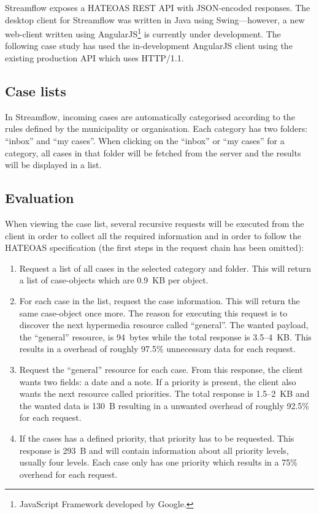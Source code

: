 \documentclass{cslthse-msc}
\begin{document}
Streamflow exposes a HATEOAS REST API with JSON-encoded responses. The desktop client for Streamflow was written in Java using Swing---however, a new web-client written using AngularJS\footnote{JavaScript Framework developed by Google.} is currently under development. The following case study has used the in-development AngularJS client using the existing production API which uses HTTP/1.1.

\subsection{Case lists}
In Streamflow, incoming cases are automatically categorised according to the rules defined by the municipality or organisation. Each category has two folders: \enquote{inbox} and \enquote{my cases}. When clicking on the \enquote{inbox} or \enquote{my cases} for a category, all cases in that folder will be fetched from the server and the results will be displayed in a list.

\subsection{Evaluation}
When viewing the case list, several recursive requests will be executed from the client in order to collect all the required information and in order to follow the HATEOAS specification (the first steps in the request chain has been omitted):

\begin{enumerate}
	\item Request a list of all cases in the selected category and folder. This will return a list of case-objects which are 0.9~KB per object.
	\item For each case in the list, request the case information. This will return the same case-object once more. The reason for executing this request is to discover the next hypermedia resource called \enquote{general}. The wanted payload, the \enquote{general} resource, is 94~bytes while the total response is 3.5--4~KB. This results in a overhead of roughly 97.5\% unnecessary data for each request.
	\item Request the \enquote{general} resource for each case. From this response, the client wants two fields: a date and a note. If a priority is present, the client also wants the next resource called priorities. The total response is 1.5--2~KB and the wanted data is 130~B resulting in a unwanted overhead of roughly 92.5\% for each request.
	\item If the cases has a defined priority, that priority has to be requested. This response is 293~B and will contain information about all priority levels, usually four levels. Each case only has one priority which results in a 75\% overhead for each request.
\end{enumerate}
\end{document}
